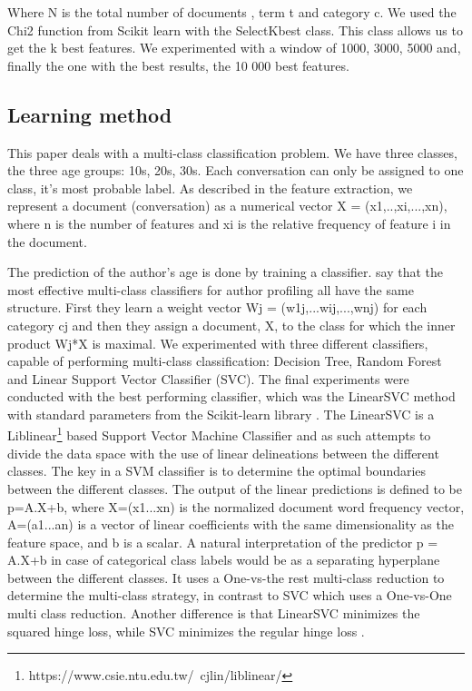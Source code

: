 \documentclass{clv3}
\begin{document}
Where N is the total number of documents , term t and category c.
We used the Chi2 function from Scikit learn with the SelectKbest class.  This class allows us to get the k best features. We experimented with a window of 1000, 3000, 5000 and, finally the one with the best results, the 10 000 best features.

\subsection{Learning method}
This paper deals with a multi-class classification problem. We have three classes, the three age groups: 10s, 20s, 30s. Each conversation can only be assigned to one class, it's most probable label. As described in the feature extraction, we represent a document (conversation) as a numerical vector X = (x1,..,xi,...,xn), where n is the number of features and xi is the relative frequency of feature i in the document.

The prediction of the author's age is done by training a classifier. \citet{argamon2009automatically} say that the most effective multi-class classifiers for author profiling all have the same structure. First they learn a weight vector Wj = (w1j,...wij,...,wnj) for each category cj and then they assign a document, X, to the class for which the inner product Wj*X is maximal. We experimented with three different classifiers, capable of performing multi-class classification: Decision Tree, Random Forest and Linear Support Vector Classifier (SVC). The final experiments were conducted with the best performing classifier, which was the LinearSVC method with standard parameters from the Scikit-learn library \cite{pedregosa2011scikit}. The LinearSVC is a Liblinear\footnote{https://www.csie.ntu.edu.tw/~cjlin/liblinear/} based Support Vector Machine Classifier and as such attempts to divide the data space with the use of linear delineations between the different classes. The key in a SVM classifier is to determine the optimal boundaries between the different classes. The output of the linear predictions is defined to be p=A.X+b, where X=(x1...xn) is the normalized document word frequency vector, A=(a1...an) is a vector of linear coefficients with the same dimensionality as the feature space, and b is a scalar. A natural interpretation of the predictor p = A.X+b in case of categorical class labels would be as a separating hyperplane between the different classes. It uses a One-vs-the rest multi-class reduction to determine the multi-class strategy, in contrast to SVC which uses a One-vs-One multi class reduction. Another difference is that LinearSVC minimizes the squared hinge loss, while SVC minimizes the regular hinge loss \citep{aggarwal2012survey,pedregosa2011scikit}.
\end{document}
